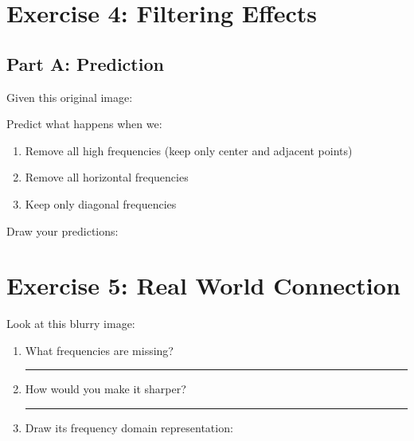 \documentclass{article}
\begin{document}
\section*{Exercise 4: Filtering Effects}

\subsection*{Part A: Prediction}
Given this original image:
\begin{center}
\end{center}

Predict what happens when we:
\begin{enumerate}
\item Remove all high frequencies (keep only center and adjacent points)
\item Remove all horizontal frequencies
\item Keep only diagonal frequencies
\end{enumerate}

Draw your predictions:
\begin{center}
\end{center}

\section*{Exercise 5: Real World Connection}

Look at this blurry image:
\begin{center}
\end{center}

\begin{enumerate}
\item What frequencies are missing? \rule{8cm}{0.15mm}
\item How would you make it sharper? \rule{8cm}{0.15mm}
\item Draw its frequency domain representation:
\begin{center}
\end{center}
\end{enumerate}
\end{document}
